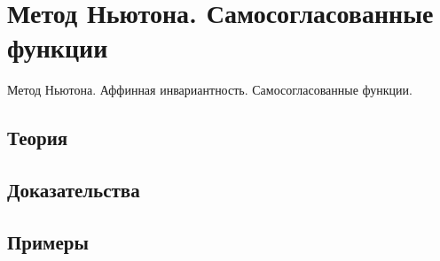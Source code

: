 
\section{Метод Ньютона. Самосогласованные функции}
\label{sec:2.4.15-newton-method}

\begin{ticket}
Метод Ньютона. Аффинная инвариантность. Самосогласованные функции.
\end{ticket}

\subsection*{Теория}

\subsection*{Доказательства}

\subsection*{Примеры}
